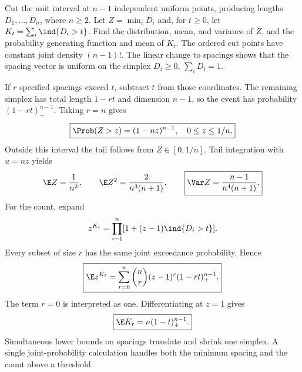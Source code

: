 Cut the unit interval at $n-1$ independent uniform points, producing lengths $D_1,\ldots,D_n$, where $n\ge2$. Let $Z=\min_iD_i$ and, for $t\ge0$, let $K_t=\sum_i\ind\{D_i>t\}$. Find the distribution, mean, and variance of $Z$, and the probability generating function and mean of $K_t$.
\solution The ordered cut points have constant joint density $(n-1)!$. The linear change to spacings shows that the spacing vector is uniform on the simplex $D_i\ge0$, $\sum_iD_i=1$.

If $r$ specified spacings exceed $t$, subtract $t$ from those coordinates. The remaining simplex has total length $1-rt$ and dimension $n-1$, so the event has probability $(1-rt)_+^{n-1}$. Taking $r=n$ gives
\[
\boxed{\Prob(Z>z)=(1-nz)^{n-1},\quad0\le z\le1/n.}
\]
Outside this interval the tail follows from $Z\in[0,1/n]$. Tail integration with $u=nz$ yields
\[
\E Z=\frac1{n^2},\qquad
\E Z^2=\frac2{n^3(n+1)},\qquad
\boxed{\Var Z=\frac{n-1}{n^4(n+1)}.}
\]
For the count, expand
\[
z^{K_t}=\prod_{i=1}^n[1+(z-1)\ind\{D_i>t\}].
\]
Every subset of size $r$ has the same joint exceedance probability. Hence
\[
\boxed{\E z^{K_t}=\sum_{r=0}^n\binom nr(z-1)^r(1-rt)_+^{n-1}.}
\]
The term $r=0$ is interpreted as one. Differentiating at $z=1$ gives
\[
\boxed{\E K_t=n(1-t)_+^{n-1}.}
\]
\insight Simultaneous lower bounds on spacings translate and shrink one simplex. A single joint-probability calculation handles both the minimum spacing and the count above a threshold.
